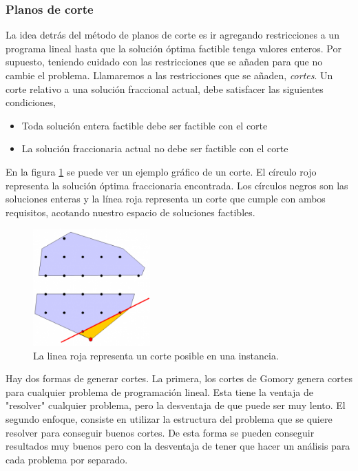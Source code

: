 \documentclass[10pt, a4paper]{article}
\theoremstyle{definition}
\begin{document}
\subsubsection{Planos de corte}
La idea detrás del método de planos de corte es ir agregando restricciones a un programa lineal hasta que la solución óptima factible tenga valores enteros. Por supuesto, teniendo cuidado con las restricciones que se añaden para que no cambie el problema.
Llamaremos a las restricciones que se añaden, \textit{cortes}. Un corte relativo a una solución fraccional actual, debe satisfacer las siguientes condiciones,
\begin{itemize}
  \item Toda solución entera factible debe ser factible con el corte
  \item La solución fraccionaria actual no debe ser factible con el corte
\end{itemize}

En la figura \ref{fig:ejemplo_cut} se puede ver un ejemplo gráfico de un corte. El círculo rojo representa la solución óptima fraccionaria encontrada. Los círculos negros son las soluciones enteras y la línea roja representa un corte que cumple con ambos requisitos, acotando nuestro espacio de soluciones factibles.
\begin{figure}[H]
  \centering
  \includegraphics[width=0.4\textwidth]{ejemplo_cut.png}
  \caption{La linea roja representa un corte posible en una instancia.}
  \label{fig:ejemplo_cut}
\end{figure}

Hay dos formas de generar cortes. La primera, los cortes de Gomory genera cortes para cualquier problema de programación lineal. Esta tiene la ventaja de "resolver" cualquier problema, pero la desventaja de que puede ser muy lento. El segundo enfoque, consiste en utilizar la estructura del problema que se quiere resolver para conseguir buenos cortes. De esta forma se pueden conseguir resultados muy buenos pero con la desventaja de tener que hacer un análisis para cada problema por separado.\\
\end{document}
